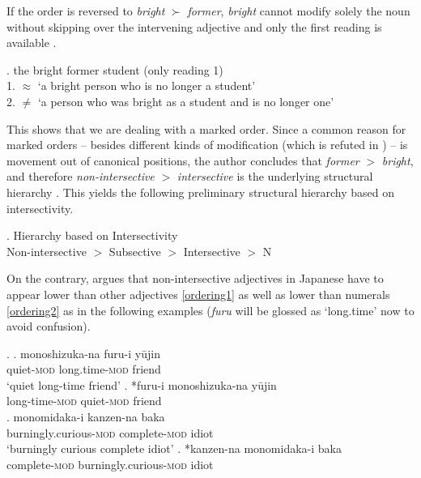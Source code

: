 \documentclass [output=book,colorlinks,citecolor=brown]{langscibook}
\begin{document}
If the order is reversed to \textit{bright} $\succ$ \textit{former}, \textit{bright} cannot modify solely the noun without skipping over the intervening adjective and only the first reading is available \citep[106]{panayidou:2013:in}.

\ex. the bright former student (only reading 1)\\
1. $\approx$ `a bright person who is no longer a student’\\
2. $\neq$ `a person who was bright as a student and is no longer one’

This shows that we are dealing with a marked order. Since a common reason for marked orders -- besides different kinds of modification (which is refuted in \citealt[Chapter 3.5.2]{panayidou:2013:in}) -- is movement out of canonical positions, the author concludes that \textit{former} $>$ \textit{bright}, and therefore \textit{non-intersective} $>$ \textit{intersective} is the underlying structural hierarchy \citep[107–111]{panayidou:2013:in}. This yields the following preliminary structural hierarchy based on intersectivity.

\ex. Hierarchy based on Intersectivity \citep{trost:2006:das, svenonius:2008:position, panayidou:2013:in}\\
Non-intersective $>$ Subsective $>$ Intersective $>$ N

On the contrary, \citet{ayano:2010:revisiting} argues that non-intersective adjectives in Japanese have to appear lower than other adjectives \ref{ordering1} as well as lower than numerals \ref{ordering2} as in the following examples (\textit{furu} will be glossed as `long.time' now to avoid confusion). %

\ex. \label{ordering1} \ag. monoshizuka-na furu-i yūjin\\
quiet-\textsc{mod} long.time-\textsc{mod} friend\\
`quiet long-time friend' \hfill \citep[104]{ayano:2010:revisiting}
\bg. *furu-i monoshizuka-na yūjin\\
long-time-\textsc{mod} quiet-\textsc{mod} friend\\
\cg. monomidaka-i kanzen-na baka\\
burningly.curious-\textsc{mod} complete-\textsc{mod} idiot\\
`burningly curious complete idiot' \hfill \citep[105]{ayano:2010:revisiting}
\dg. *kanzen-na monomidaka-i baka\\
complete-\textsc{mod} burningly.curious-\textsc{mod} idiot\\
\end{document}
